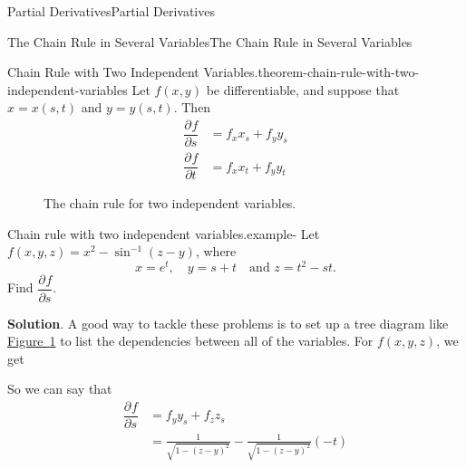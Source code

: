 \documentclass[10pt,]{book}
\numberwithin{equation}{section}
\newcommand{\pdv}[3][]{\dfrac{\partial^{#1} #2}{\partial #3^{#1}}}
\begin{document}
\begin{chapterptx}{Partial Derivatives}{}{Partial Derivatives}{}{}
\begin{sectionptx}{The Chain Rule in Several Variables}{}{The Chain Rule in Several Variables}{}{}
\begin{theorem}{Chain Rule with Two Independent Variables.}{}{theorem-chain-rule-with-two-independent-variables}
\hypertarget{p-1172}{}%
Let \(f(x,y)\) be differentiable, and suppose that \(x = x(s,t)\) and \(y = y(s,t)\). Then%
\begin{align*}
\pdv{f}{s} & = f_{x}x_{s} + f_{y}y_{s} \\
\pdv{f}{t} & = f_{x}x_{t} + f_{y}y_{t} 
\end{align*}
%
\end{theorem}
\begin{figure}
\centering
{
}
\caption{The chain rule for two independent variables.\label{figure-chain-rule-two-independent-variables}}
\end{figure}
\begin{example}{Chain rule with two independent variables.}{example-}%
\hypertarget{p-1173}{}%
Let \(f(x,y,z) = x^{2} - \sin^{-1}(z-y)\), where%
\begin{equation*}
x = e^{t}, \quad y = s + t\quad\text{and } z = t^{2} - st.
\end{equation*}
Find \(\pdv{f}{s}\).%
\par\smallskip%
\noindent\textbf{Solution}.\hypertarget{solution-183}{}\quad%
\hypertarget{p-1174}{}%
A good way to tackle these problems is to set up a tree diagram like \hyperref[figure-chain-rule-two-independent-variables]{Figure~\ref{figure-chain-rule-two-independent-variables}} to list the dependencies between all of the variables. For \(f(x,y,z)\), we get \begin{figure}
\centering
{
}
\end{figure}
 So we can say that%
\begin{align*}
\pdv{f}{s} & = f_{y}y_{s} + f_{z}z_{s} \\
& = \frac{1}{\sqrt{1 - (z - y)^{2}}} - \frac{1}{\sqrt{1 - (z - y)^{2}}}(-t) \\

\end{align*}
\end{example}
\end{sectionptx}
\end{chapterptx}
\end{document}
